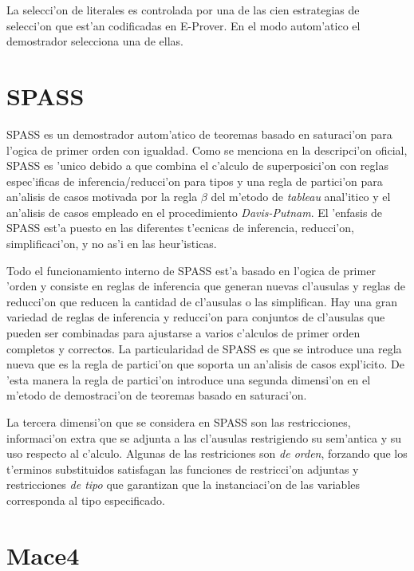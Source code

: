 La selecci'on de literales es controlada por una de las cien estrategias de selecci'on que est'an codificadas en E-Prover. En el modo autom'atico el demostrador selecciona una de ellas. 




\section{SPASS}

SPASS es un demostrador autom'atico de teoremas basado en saturaci'on para l'ogica de primer orden con igualdad. Como se menciona en la descripci'on oficial, SPASS es 'unico debido a que combina el c'alculo de superposici'on con reglas espec'ificas de inferencia/reducci'on para tipos y una regla de partici'on para an'alisis de casos motivada por la regla $\beta$ del m'etodo de \textit{tableau} anal'itico y el an'alisis de casos empleado en el procedimiento \textit{Davis-Putnam}. El 'enfasis de SPASS est'a puesto en las diferentes t'ecnicas de inferencia, reducci'on, simplificaci'on, y no as'i en las heur'isticas.

Todo el funcionamiento interno de SPASS est'a basado en l'ogica de primer 'orden y consiste en reglas de inferencia que generan nuevas cl'ausulas y reglas de reducci'on que reducen la cantidad de cl'ausulas o las simplifican. Hay una gran variedad de reglas de inferencia y reducci'on para conjuntos de cl'ausulas que pueden ser combinadas para ajustarse a varios c'alculos de primer orden completos y correctos. La particularidad de SPASS es que se introduce una regla nueva que es la regla de partici'on que soporta un an'alisis de casos expl'icito. De 'esta manera la regla de partici'on introduce una segunda dimensi'on en el m'etodo de demostraci'on de teoremas basado en saturaci'on.

La tercera dimensi'on que se considera en SPASS son las restricciones, informaci'on extra que se adjunta a las cl'ausulas restrigiendo su sem'antica y su uso respecto al c'alculo. Algunas de las restriciones son \textit{de orden}, forzando que los t'erminos substituidos satisfagan las funciones de restricci'on adjuntas y restricciones \textit{de tipo} que garantizan que la instanciaci'on de las variables corresponda al tipo especificado.


\section{Mace4}

